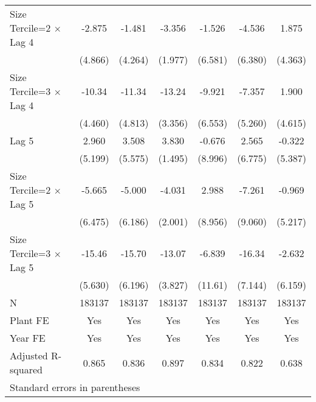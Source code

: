\begin{table}[htbp]
\begin{tabular}{l*{6}{c}}
\addlinespace
Size Tercile=2 $\times$ Lag 4&   -2.875         &   -1.481         &   -3.356         &   -1.526         &   -4.536         &    1.875         \\
                &  (4.866)         &  (4.264)         &  (1.977)         &  (6.581)         &  (6.380)         &  (4.363)         \\
\addlinespace
Size Tercile=3 $\times$ Lag 4&   -10.34\sym{*}  &   -11.34\sym{*}  &   -13.24\sym{***}&   -9.921         &   -7.357         &    1.900         \\
                &  (4.460)         &  (4.813)         &  (3.356)         &  (6.553)         &  (5.260)         &  (4.615)         \\
\addlinespace
Lag 5           &    2.960         &    3.508         &    3.830\sym{*}  &   -0.676         &    2.565         &   -0.322         \\
                &  (5.199)         &  (5.575)         &  (1.495)         &  (8.996)         &  (6.775)         &  (5.387)         \\
\addlinespace
Size Tercile=2 $\times$ Lag 5&   -5.665         &   -5.000         &   -4.031\sym{*}  &    2.988         &   -7.261         &   -0.969         \\
                &  (6.475)         &  (6.186)         &  (2.001)         &  (8.956)         &  (9.060)         &  (5.217)         \\
\addlinespace
Size Tercile=3 $\times$ Lag 5&   -15.46\sym{**} &   -15.70\sym{*}  &   -13.07\sym{***}&   -6.839         &   -16.34\sym{*}  &   -2.632         \\
                &  (5.630)         &  (6.196)         &  (3.827)         &  (11.61)         &  (7.144)         &  (6.159)         \\
\midrule
N               &   183137         &   183137         &   183137         &   183137         &   183137         &   183137         \\
Plant FE        &      Yes         &      Yes         &      Yes         &      Yes         &      Yes         &      Yes         \\
Year FE         &      Yes         &      Yes         &      Yes         &      Yes         &      Yes         &      Yes         \\
Adjusted R-squared&    0.865         &    0.836         &    0.897         &    0.834         &    0.822         &    0.638         \\
\bottomrule
\multicolumn{7}{l}{\footnotesize Standard errors in parentheses}\\

\end{tabular}
\end{table}
